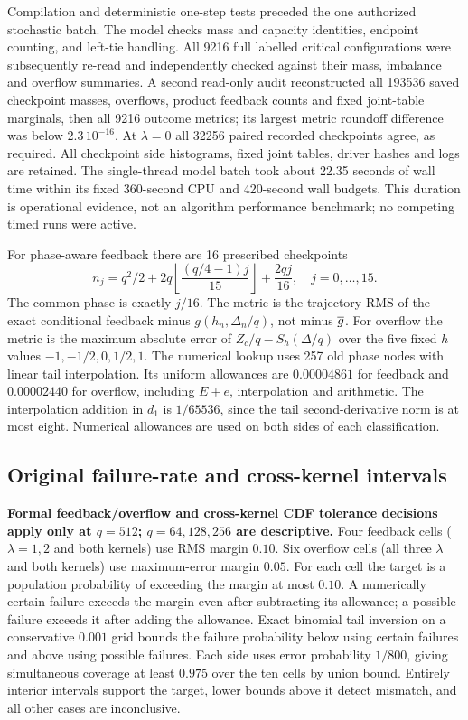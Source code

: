 Compilation and deterministic one-step tests preceded the one authorized stochastic batch. The model checks mass and capacity identities, endpoint counting, and left-tie handling. All 9216 full labelled critical configurations were subsequently re-read and independently checked against their mass, imbalance and overflow summaries. A second read-only audit reconstructed all 193536 saved checkpoint masses, overflows, product feedback counts and fixed joint-table marginals, then all 9216 outcome metrics; its largest metric roundoff difference was below $2.3\,10^{-16}$. At $\lambda=0$ all 32256 paired recorded checkpoints agree, as required. All checkpoint side histograms, fixed joint tables, driver hashes and logs are retained. The single-thread model batch took about 22.35 seconds of wall time within its fixed 360-second CPU and 420-second wall budgets. This duration is operational evidence, not an algorithm performance benchmark; no competing timed runs were active.

For phase-aware feedback there are 16 prescribed checkpoints
\[
 n_j=q^2/2+2q\left\lfloor\frac{(q/4-1)j}{15}\right\rfloor
                  +\frac{2qj}{16},\quad j=0,\ldots,15.
\]
The common phase is exactly $j/16$. The metric is the trajectory RMS of the exact conditional feedback minus $g(h_n,\Delta_n/q)$, not minus $\overline g$. For overflow the metric is the maximum absolute error of $Z_c/q-S_h(\Delta/q)$ over the five fixed $h$ values $-1,-1/2,0,1/2,1$. The numerical lookup uses 257 old phase nodes with linear tail interpolation. Its uniform allowances are $0.00004861$ for feedback and $0.00002440$ for overflow, including $E+e$, interpolation and arithmetic. The interpolation addition in $d_1$ is $1/65536$, since the tail second-derivative norm is at most eight. Numerical allowances are used on both sides of each classification.

\subsection{Original failure-rate and cross-kernel intervals}
\textbf{Formal feedback/overflow and cross-kernel CDF tolerance decisions apply only at $q=512$; $q=64,128,256$ are descriptive.} Four feedback cells ($\lambda=1,2$ and both kernels) use RMS margin $0.10$. Six overflow cells (all three $\lambda$ and both kernels) use maximum-error margin $0.05$. For each cell the target is a population probability of exceeding the margin at most $0.10$. A numerically certain failure exceeds the margin even after subtracting its allowance; a possible failure exceeds it after adding the allowance. Exact binomial tail inversion on a conservative $0.001$ grid bounds the failure probability below using certain failures and above using possible failures. Each side uses error probability $1/800$, giving simultaneous coverage at least $0.975$ over the ten cells by union bound. Entirely interior intervals support the target, lower bounds above it detect mismatch, and all other cases are inconclusive.

